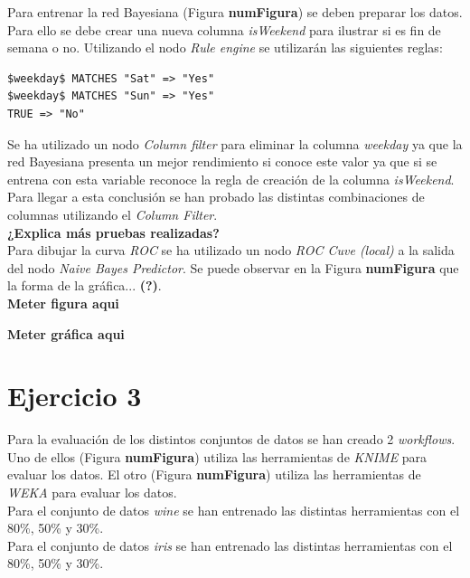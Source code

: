 \documentclass[10pt,a4paper]{article}
\begin{document}
Para entrenar la red Bayesiana (Figura \textbf{numFigura}) se deben preparar los datos. Para ello se debe crear una nueva columna \emph{isWeekend} para ilustrar si es fin de semana o no. Utilizando el nodo \emph{Rule engine} se utilizarán las siguientes reglas:

\begin{lstlisting}
$weekday$ MATCHES "Sat" => "Yes"
$weekday$ MATCHES "Sun" => "Yes"
TRUE => "No"
\end{lstlisting}

Se ha utilizado un nodo \emph{Column filter} para eliminar la columna \emph{weekday} ya que la red Bayesiana presenta un mejor rendimiento si conoce este valor ya que si se entrena con esta variable reconoce la regla de creación de la columna \emph{isWeekend}.\\
Para llegar a esta conclusión se han probado las distintas combinaciones de columnas utilizando el \emph{Column Filter}.\\
\textbf{¿Explica más pruebas realizadas?}\\

Para dibujar la curva \emph{ROC} se ha utilizado un nodo \emph{ROC Cuve (local)} a la salida del nodo \emph{Naive Bayes Predictor}. Se puede observar en la Figura \textbf{numFigura} que la forma de la gráfica... \textbf{(?)}.\\


{\Huge \textbf{Meter figura aqui}}

{\Huge \textbf{Meter gráfica aqui}}


\section{Ejercicio 3}

Para la evaluación de los distintos conjuntos de datos se han creado 2 \emph{workflows}. Uno de ellos (Figura \textbf{numFigura}) utiliza las herramientas de \emph{KNIME} para evaluar los datos. El otro (Figura \textbf{numFigura}) utiliza las herramientas de \emph{WEKA} para evaluar los datos.\\

Para el conjunto de datos \emph{wine} se han entrenado las distintas herramientas con el 80\%, 50\% y 30\%.\\
Para el conjunto de datos \emph{iris} se han entrenado las distintas herramientas con el 80\%, 50\% y 30\%.\\
\end{document}
